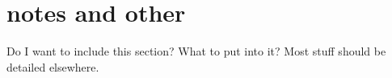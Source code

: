 \section{notes and other}

	Do I want to include this section? What to put into it? Most stuff should be detailed elsewhere.



